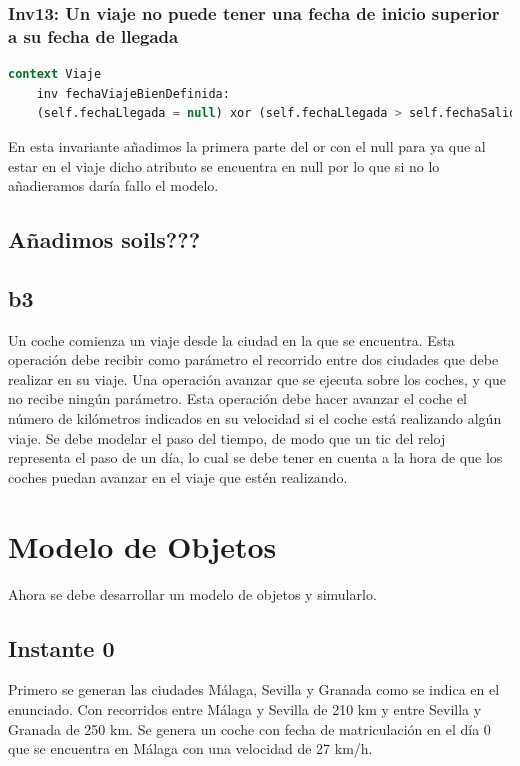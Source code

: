 \documentclass[12pt.a4paper]{article}
\begin{document}
\subsubsection{Inv13: Un viaje no puede tener una fecha de inicio superior a su fecha de llegada}
    \begin{lstlisting}[style = useEspecifico,language=SQL]
context Viaje
    inv fechaViajeBienDefinida:
    (self.fechaLlegada = null) xor (self.fechaLlegada > self.fechaSalida)
    \end{lstlisting}
    En esta invariante añadimos la primera parte del or con el null para ya que al estar en el viaje dicho atributo se encuentra en null por lo que si no lo añadieramos daría fallo el modelo.

\subsection{Añadimos soils???}
    
\subsection{b3}
Un coche comienza un viaje desde la ciudad en la que se encuentra. Esta operación debe recibir como parámetro el recorrido entre dos ciudades que debe realizar en su viaje.
Una operación avanzar que se ejecuta sobre los coches, y que no recibe ningún parámetro. Esta operación debe hacer avanzar el coche el número de kilómetros indicados en su velocidad si el coche está realizando algún viaje. Se debe modelar el paso del tiempo, de modo que un tic del reloj representa el paso de un día, lo cual se debe tener en cuenta a la hora de que los coches puedan avanzar en el viaje que estén realizando.

\section{Modelo de Objetos}
Ahora se debe desarrollar un modelo de objetos y simularlo.


\subsection{Instante 0}
Primero se generan las ciudades Málaga, Sevilla y Granada como se indica en el enunciado. Con recorridos entre Málaga y Sevilla de 210 km y entre Sevilla y Granada de 250 km. Se genera un coche con fecha de matriculación en el día 0 que se encuentra en Málaga con una velocidad de 27 km/h.
\end{document}
